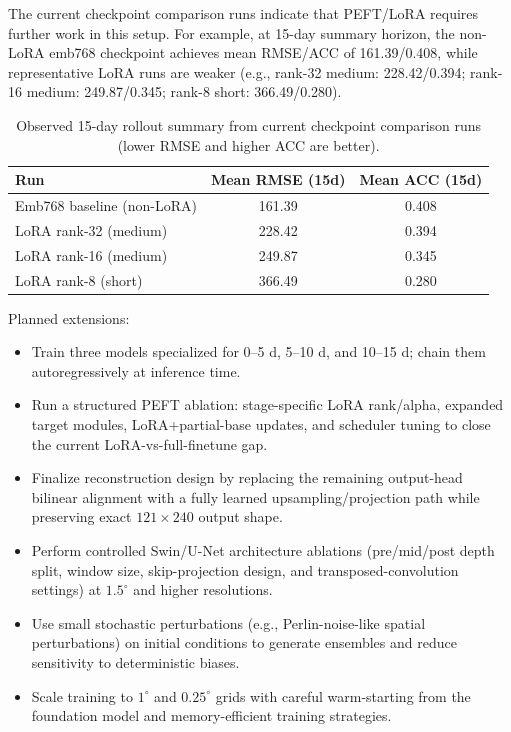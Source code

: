 \documentclass[12pt]{report}
\begin{document}
The current checkpoint comparison runs indicate that PEFT/LoRA requires further work in this setup. For example, at 15-day summary horizon, the non-LoRA emb768 checkpoint achieves mean RMSE/ACC of 161.39/0.408, while representative LoRA runs are weaker (e.g., rank-32 medium: 228.42/0.394; rank-16 medium: 249.87/0.345; rank-8 short: 366.49/0.280).

\begin{table}[!htbp]
\centering
\begin{tabular}{lcc}
\hline
Run & Mean RMSE (15d) & Mean ACC (15d) \\
\hline
Emb768 baseline (non-LoRA) & 161.39 & 0.408 \\
LoRA rank-32 (medium) & 228.42 & 0.394 \\
LoRA rank-16 (medium) & 249.87 & 0.345 \\
LoRA rank-8 (short) & 366.49 & 0.280 \\
\hline
\end{tabular}
\caption{Observed 15-day rollout summary from current checkpoint comparison runs (lower RMSE and higher ACC are better).}
\label{tab:peft_gap}
\end{table}

Planned extensions:
\begin{itemize}
  \item Train three models specialized for 0--5 d, 5--10 d, and 10--15 d; chain them autoregressively at inference time.
  \item Run a structured PEFT ablation: stage-specific LoRA rank/alpha, expanded target modules, LoRA+partial-base updates, and scheduler tuning to close the current LoRA-vs-full-finetune gap.
  \item Finalize reconstruction design by replacing the remaining output-head bilinear alignment with a fully learned upsampling/projection path while preserving exact $121\times240$ output shape.
  \item Perform controlled Swin/U-Net architecture ablations (pre/mid/post depth split, window size, skip-projection design, and transposed-convolution settings) at $1.5^\circ$ and higher resolutions.
  \item Use small stochastic perturbations (e.g., Perlin-noise-like spatial perturbations) on initial conditions to generate ensembles and reduce sensitivity to deterministic biases.
  \item Scale training to $1^\circ$ and $0.25^\circ$ grids with careful warm-starting from the foundation model and memory-efficient training strategies.
\end{itemize}
\end{document}
